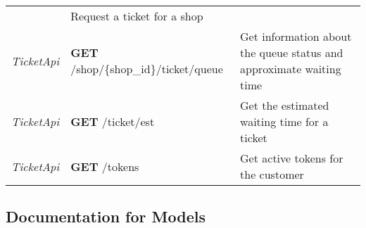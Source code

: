 \begin{longtable}[]{@{}lll@{}}
\begin{minipage}[t]{0.31\columnwidth}
\end{minipage} & \begin{minipage}[t]{0.31\columnwidth}\raggedright
Request a ticket for a shop\strut
\end{minipage}\tabularnewline
\begin{minipage}[t]{0.29\columnwidth}\raggedright
\emph{TicketApi}\strut
\end{minipage} & \begin{minipage}[t]{0.31\columnwidth}\raggedright
\textbf{GET} /shop/\{shop\_id\}/ticket/queue\strut
\end{minipage} & \begin{minipage}[t]{0.31\columnwidth}\raggedright
Get information about the queue status and approximate waiting
time\strut
\end{minipage}\tabularnewline
\begin{minipage}[t]{0.29\columnwidth}\raggedright
\emph{TicketApi}\strut
\end{minipage} & \begin{minipage}[t]{0.31\columnwidth}\raggedright
\textbf{GET} /ticket/est\strut
\end{minipage} & \begin{minipage}[t]{0.31\columnwidth}\raggedright
Get the estimated waiting time for a ticket\strut
\end{minipage}\tabularnewline
\begin{minipage}[t]{0.29\columnwidth}\raggedright
\emph{TicketApi}\strut
\end{minipage} & \begin{minipage}[t]{0.31\columnwidth}\raggedright
\textbf{GET} /tokens\strut
\end{minipage} & \begin{minipage}[t]{0.31\columnwidth}\raggedright
Get active tokens for the customer\strut
\end{minipage}\tabularnewline
\bottomrule
\end{longtable}

\hypertarget{documentation-for-models}{%
\subsection{Documentation for Models}\label{documentation-for-models}}

